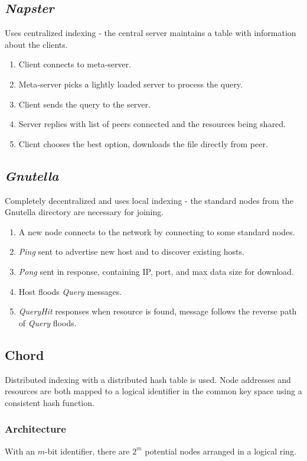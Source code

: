 \documentclass[11pt]{article}
\begin{document}
\subsection{\textit{Napster}}
Uses centralized indexing - the central server maintains a table with information about the clients.
\begin{enumerate}
  \item Client connects to meta-server.
  \item Meta-server picks a lightly loaded server to process the query.
  \item Client sends the query to the server.
  \item Server replies with list of peers connected and the resources being shared.
  \item Client chooses the best option, downloads the file directly from peer.
\end{enumerate}

\subsection{\textit{Gnutella}}
Completely decentralized and uses local indexing - the standard nodes from the Gnutella directory are necessary for joining.
\begin{enumerate}
  \item A new node connects to the network by connecting to some standard nodes.
  \item \textit{Ping} sent to advertise new host and to discover existing hosts.
  \item \textit{Pong} sent in response, containing IP, port, and max data size for download.
  \item Host floods \textit{Query} messages.
  \item \textit{QueryHit} responses when resource is found, message follows the reverse path of \textit{Query} floods.
\end{enumerate}

\subsection{Chord}
Distributed indexing with a distributed hash table is used.
Node addresses and resources are both mapped to a logical identifier in the common key space using a consistent hash function.

\subsubsection{Architecture}
With an $m$-bit identifier, there are $2^m$ potential nodes arranged in a logical ring.
\end{document}
